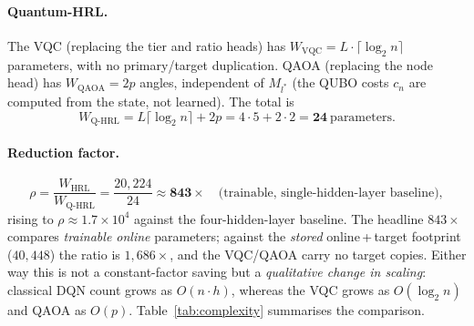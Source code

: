 \documentclass[11pt,a4paper]{article}
\theoremstyle{definition}
\begin{document}
\paragraph{Quantum-HRL.}
The VQC (replacing the tier and ratio heads) has $W_{\mathrm{VQC}} = L \cdot \lceil\log_2 n\rceil$ parameters, with no primary/target duplication. QAOA (replacing the node head) has $W_{\mathrm{QAOA}} = 2p$ angles, independent of $M_{l^*}$ (the QUBO costs $c_n$ are computed from the state, not learned). The total is
\begin{equation}
  W_{\mathrm{Q\text{-}HRL}} = L\lceil\log_2 n\rceil + 2p = 4 \cdot 5 + 2 \cdot 2 = \mathbf{24}\ \text{parameters}.
  \label{eq:qhrl_total}
\end{equation}

\paragraph{Reduction factor.}
\begin{equation}
  \rho = \frac{W_{\mathrm{HRL}}}{W_{\mathrm{Q\text{-}HRL}}}
  = \frac{20{,}224}{24} \approx \mathbf{843\times}
  \quad\text{(trainable, single-hidden-layer baseline)},
  \label{eq:reduction}
\end{equation}
rising to $\rho \approx 1.7\times10^{4}$ against the four-hidden-layer baseline. The headline $843\times$ compares \emph{trainable online} parameters; against the \emph{stored} online\,+\,target footprint ($40{,}448$) the ratio is $1{,}686\times$, and the VQC/QAOA carry no target copies. Either way this is not a constant-factor saving but a \emph{qualitative change in scaling}: classical DQN count grows as $O(n\cdot h)$, whereas the VQC grows as $O(\log_2 n)$ and QAOA as $O(p)$. Table~\ref{tab:complexity} summarises the comparison.
\end{document}
